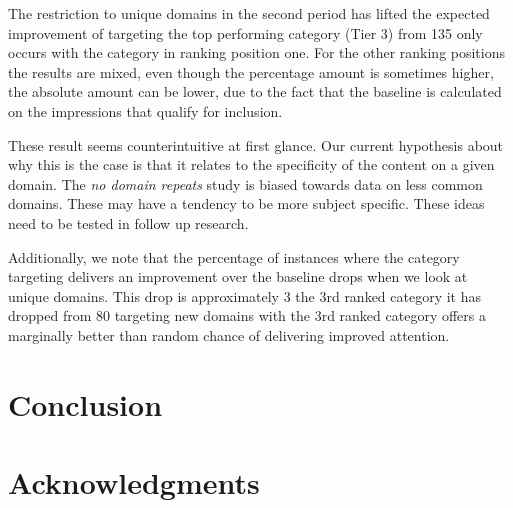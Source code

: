 \documentclass[sigconf]{acmart}
\begin{document}
The restriction to unique domains in the second period has lifted the expected improvement
of targeting the top performing category (Tier 3) from 135%
only occurs with the category in ranking position one. For the other ranking positions
the results are mixed, even though the percentage amount is sometimes higher, the
absolute amount can be lower, due to the fact that the baseline is calculated on
the impressions that qualify for inclusion.

These result seems counterintuitive at first glance. Our current hypothesis about why
this is the case is that it relates to the specificity of the content on a given domain.
The \emph{no domain repeats} study is biased towards data on less common domains.
These may have a tendency to be more subject specific.
These ideas need to be tested in follow up research.

Additionally, we note that the percentage of instances where the category targeting
delivers an improvement over the baseline drops when we look at unique domains.
This drop is approximately 3%
the 3rd ranked category it has dropped from 80%
targeting new domains with the 3rd ranked category offers a marginally better than
random chance of delivering improved attention.


\section{Conclusion}

\section{Acknowledgments}



\end{document}
